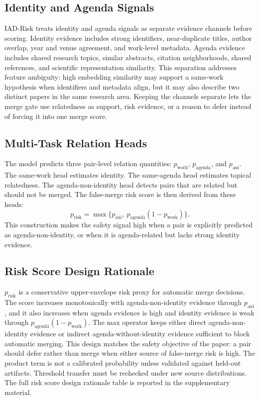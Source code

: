 \documentclass[preprint,12pt]{elsarticle}
\begin{document}
\subsection{Identity and Agenda Signals}

IAD-Risk treats identity and agenda signals as separate evidence channels before scoring. Identity evidence includes strong identifiers, near-duplicate titles, author overlap, year and venue agreement, and work-level metadata. Agenda evidence includes shared research topics, similar abstracts, citation neighborhoods, shared references, and scientific representation similarity. This separation addresses feature ambiguity: high embedding similarity may support a same-work hypothesis when identifiers and metadata align, but it may also describe two distinct papers in the same research area. Keeping the channels separate lets the merge gate use relatedness as support, risk evidence, or a reason to defer instead of forcing it into one merge score.

\subsection{Multi-Task Relation Heads}

The model predicts three pair-level relation quantities: $p_{\mathrm{work}}$, $p_{\mathrm{agenda}}$, and $p_{\mathrm{ani}}$. The same-work head estimates identity. The same-agenda head estimates topical relatedness. The agenda-non-identity head detects pairs that are related but should not be merged. The false-merge risk score is then derived from these heads:
\[
p_{\mathrm{risk}}=\max\{p_{\mathrm{ani}},\ p_{\mathrm{agenda}}(1-p_{\mathrm{work}})\}.
\]
This construction makes the safety signal high when a pair is explicitly predicted as agenda-non-identity, or when it is agenda-related but lacks strong identity evidence.

\subsection{Risk Score Design Rationale}

$p_{\mathrm{risk}}$ is a conservative upper-envelope risk proxy for automatic merge decisions. The score increases monotonically with agenda-non-identity evidence through $p_{\mathrm{ani}}$, and it also increases when agenda evidence is high and identity evidence is weak through $p_{\mathrm{agenda}}(1-p_{\mathrm{work}})$. The max operator keeps either direct agenda-non-identity evidence or indirect agenda-without-identity evidence sufficient to block automatic merging. This design matches the safety objective of the paper: a pair should defer rather than merge when either source of false-merge risk is high. The product term is not a calibrated probability unless validated against held-out artifacts. Threshold transfer must be rechecked under new source distributions. The full risk score design rationale table is reported in the supplementary material.
\end{document}
